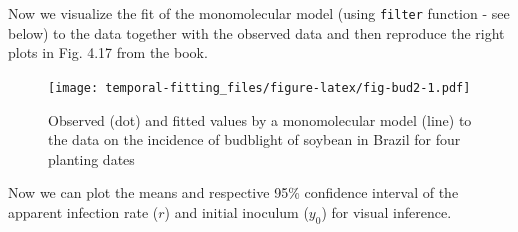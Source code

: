 \documentclass[
  letterpaper,
]{book}
\newenvironment{Shaded}{\begin{snugshade}}{\end{snugshade}}
\newcommand{\AttributeTok}[1]{\textcolor[rgb]{0.40,0.45,0.13}{#1}}
\newcommand{\CommentTok}[1]{\textcolor[rgb]{0.37,0.37,0.37}{#1}}
\newcommand{\DecValTok}[1]{\textcolor[rgb]{0.68,0.00,0.00}{#1}}
\newcommand{\FloatTok}[1]{\textcolor[rgb]{0.68,0.00,0.00}{#1}}
\newcommand{\FunctionTok}[1]{\textcolor[rgb]{0.28,0.35,0.67}{#1}}
\newcommand{\NormalTok}[1]{\textcolor[rgb]{0.00,0.23,0.31}{#1}}
\newcommand{\SpecialCharTok}[1]{\textcolor[rgb]{0.37,0.37,0.37}{#1}}
\newcommand{\StringTok}[1]{\textcolor[rgb]{0.13,0.47,0.30}{#1}}
\begin{document}
Now we visualize the fit of the monomolecular model (using
\texttt{filter} function - see below) to the data together with the
observed data and then reproduce the right plots in Fig. 4.17 from the
book.

\begin{Shaded}
\end{Shaded}

\begin{figure}

\texttt{[image: temporal-fitting\_files/figure-latex/fig-bud2-1.pdf]} \hfill{}

\caption{\label{fig-bud2}Observed (dot) and fitted values by a
monomolecular model (line) to the data on the incidence of budblight of
soybean in Brazil for four planting dates}

\end{figure}

Now we can plot the means and respective 95\% confidence interval of the
apparent infection rate (\(r\)) and initial inoculum (\(y_0\)) for
visual inference.
\end{document}
